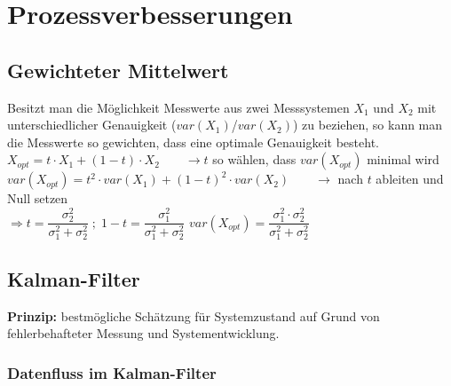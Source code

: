 \section{Prozessverbesserungen}
\subsection{Gewichteter Mittelwert}
	Besitzt man die Möglichkeit Messwerte aus zwei Messsystemen $X_1$ und $X_2$ mit unterschiedlicher Genauigkeit ($var(X_1)$/$var(X_2)$) zu beziehen, so kann man die Messwerte so gewichten, dass eine optimale Genauigkeit besteht.\\
	
	$\boxed{X_{opt} = t\cdot X_1 + (1-t) \cdot X_2} \qquad \rightarrow t$ so wählen, dass $var(X_{opt})$ minimal wird\\


	\hspace*{1cm} $var(X_{opt}) = t^2 \cdot var(X_1) + (1-t)^2 \cdot var(X_2) \qquad \rightarrow$ nach $t$ ableiten und Null setzen \\  
	
	$\Rightarrow \boxed{t = \dfrac{\sigma_2^2}{\sigma_1^2 + \sigma_2^2}} \; ; \; \boxed{1-t = \dfrac{\sigma_1^2}{\sigma_1^2 + \sigma_2^2}}$
	\hspace{1cm} $var(X_{opt}) = \dfrac{\sigma_1^2 \cdot \sigma_2^2}{\sigma_1^2 + \sigma_2^2}$

\subsection{Kalman-Filter}
	\textbf{Prinzip:} bestmögliche Schätzung für Systemzustand auf Grund von fehlerbehafteter
	Messung und Systementwicklung. \\

	\subsubsection{Datenfluss im Kalman-Filter}
		
	
